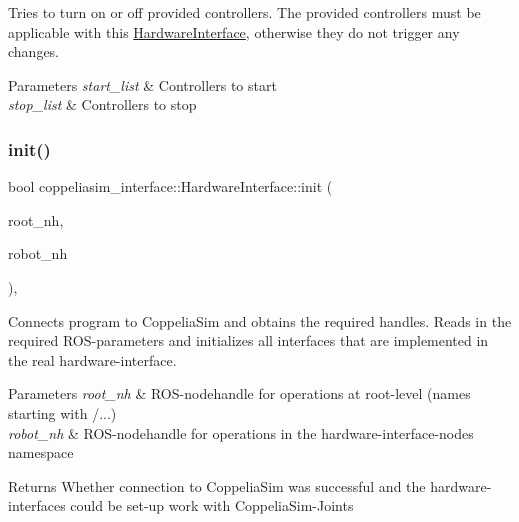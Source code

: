 Tries to turn on or off provided controllers. The provided controllers must be applicable with this \hyperlink{classcoppeliasim__interface_1_1HardwareInterface}{Hardware\+Interface}, otherwise they do not trigger any changes. 


\begin{DoxyParams}{Parameters}
{\em start\+\_\+list} & Controllers to start \\
\hline
{\em stop\+\_\+list} & Controllers to stop \\
\hline
\end{DoxyParams}
\mbox{\label{classcoppeliasim__interface_1_1HardwareInterface_ada54343beeb383c43951877e3d49cf8e}} 
\subsubsection{\texorpdfstring{init()}{init()}}
{\footnotesize\ttfamily bool coppeliasim\+\_\+interface\+::\+Hardware\+Interface\+::init (\begin{DoxyParamCaption}\item[{ros\+::\+Node\+Handle \&}]{root\+\_\+nh,  }\item[{ros\+::\+Node\+Handle \&}]{robot\+\_\+nh }\end{DoxyParamCaption})\hspace{0.3cm}{\ttfamily [override]}, {\ttfamily [virtual]}}



Connects program to Coppelia\+Sim and obtains the required handles. Reads in the required R\+O\+S-\/parameters and initializes all interfaces that are implemented in the real hardware-\/interface. 


\begin{DoxyParams}{Parameters}
{\em root\+\_\+nh} & R\+O\+S-\/nodehandle for operations at root-\/level (names starting with \textquotesingle{}/...\textquotesingle{}) \\
\hline
{\em robot\+\_\+nh} & R\+O\+S-\/nodehandle for operations in the hardware-\/interface-\/nodes namespace \\
\hline
\end{DoxyParams}
\begin{DoxyReturn}{Returns}
Whether connection to Coppelia\+Sim was successful and the hardware-\/interfaces could be set-\/up work with Coppelia\+Sim-\/\+Joints 
\end{DoxyReturn}
\mbox{\label{classcoppeliasim__interface_1_1HardwareInterface_abc05d9a9e8761462b2161a33f55203cc}} 
